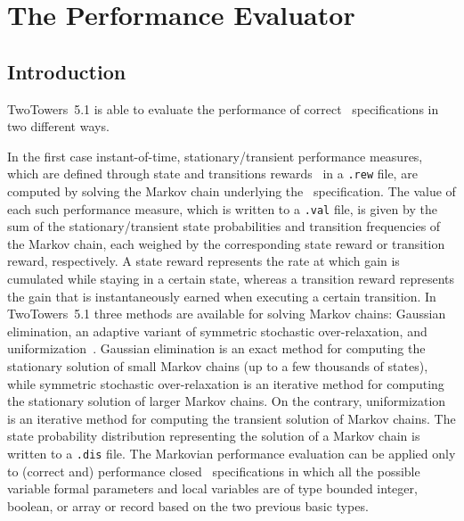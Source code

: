 \chapter{The Performance Evaluator}


\section{Introduction}

TwoTowers~5.1 is able to evaluate the performance of correct \aemilia\ specifications in two different ways.

In the first case instant-of-time, stationary/transient performance measures, which are defined through
state and transitions rewards~\cite{How} in a {\tt .rew} file, are computed by solving the Markov chain
underlying the \aemilia\ specification. The value of each such performance measure, which is written to a
{\tt .val} file, is given by the sum of the stationary/transient state probabilities and transition
frequencies of the Markov chain, each weighed by the corresponding state reward or transition reward,
respectively. A state reward represents the rate at which gain is cumulated while staying in a certain
state, whereas a transition reward represents the gain that is instantaneously earned when executing a
certain transition. In TwoTowers~5.1 three methods are available for solving Markov chains: Gaussian
elimination, an adaptive variant of symmetric stochastic over-relaxation, and uniformization~\cite{Ste1}.
Gaussian elimination is an exact method for computing the stationary solution of small Markov chains (up to
a few thousands of states), while symmetric stochastic over-relaxation is an iterative method for computing
the stationary solution of larger Markov chains. On the contrary, uniformization is an iterative method for
computing the transient solution of Markov chains. The state probability distribution representing the
solution of a Markov chain is written to a {\tt .dis} file. The Markovian performance evaluation can be
applied only to (correct and) performance closed \aemilia\ specifications in which all the possible variable
formal parameters and local variables are of type bounded integer, boolean, or array or record based on the
two previous basic types.

